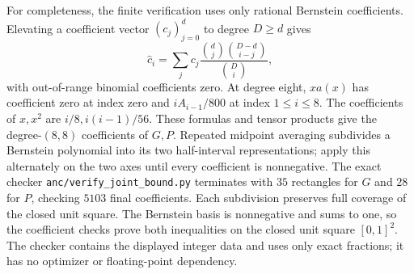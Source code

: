 \documentclass[11pt]{article}
\begin{document}
For completeness, the finite verification uses only rational Bernstein
coefficients. Elevating a coefficient vector $(c_j)_{j=0}^d$ to degree
$D\ge d$ gives
\[
 \widehat c_i=
 \sum_j c_j\frac{\binom dj\binom{D-d}{i-j}}{\binom Di},
\]
with out-of-range binomial coefficients zero. At degree eight, $xa(x)$
has coefficient zero at index zero and $iA_{i-1}/800$ at index $1\le i\le8$.
The coefficients of $x,x^2$ are $i/8,i(i-1)/56$.
These formulas and tensor products give the degree-$(8,8)$ coefficients
of $G,P$. Repeated midpoint averaging subdivides a Bernstein polynomial
into its two half-interval representations; apply this alternately on
the two axes until every coefficient is nonnegative.
The exact checker \texttt{anc/verify\_joint\_bound.py} terminates with
$35$ rectangles for $G$ and $28$ for $P$, checking $5103$ final
coefficients. Each subdivision preserves full coverage of the closed
unit square. The Bernstein basis is nonnegative and sums to one, so
the coefficient checks prove both inequalities on the closed unit square $[0,1]^2$.
The checker contains the displayed integer data and uses only exact
fractions; it has no optimizer or floating-point dependency.
\end{document}
